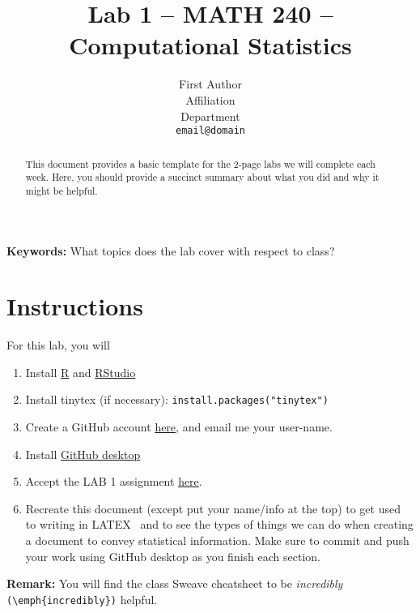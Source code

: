 \documentclass{article}\usepackage[]{graphicx}\usepackage[]{xcolor}
\begin{document}
\vspace{-1in}
\title{Lab 1 -- MATH 240 -- Computational Statistics}

\author{
  First Author \\
  Affiliation  \\
  Department  \\
  {\tt email@domain}
}

\date{}

\maketitle

\begin{multicols}{2}
\begin{abstract}
This document provides a basic template for the 2-page labs we will complete each week. Here, you should provide a succinct summary about what you did and why it might be helpful.
\end{abstract}

\textbf{Keywords:} What topics does the lab cover with respect to class?

\section{Instructions}
\noindent For this lab, you will 
\begin{enumerate}[1.]\itemsep0em
\item Install \href{https://cran.rstudio.com/}{R} and \href{https://cran.rstudio.com/}{RStudio}
\item Install tinytex (if necessary): \texttt{install.packages("tinytex")}
\item Create a GitHub account \href{https://github.com/}{here}, and email me your user-name.
\item Install \href{https://desktop.github.com/}{GitHub desktop}
\item Accept the LAB 1 assignment \href{https://classroom.github.com/a/gfC_xMMl}{here}.
\item Recreate this document (except put your name/info at the top) to get used to writing in LATEX~ and to see the types of things we can do when creating a document to convey statistical information. Make sure to commit and push your work using GitHub desktop as you finish each section.
\end{enumerate}
\noindent \textbf{Remark:} You will find the class Sweave cheatsheet to be \emph{incredibly} \verb|(\emph{incredibly})| helpful.


\end{multicols}
\end{document}
